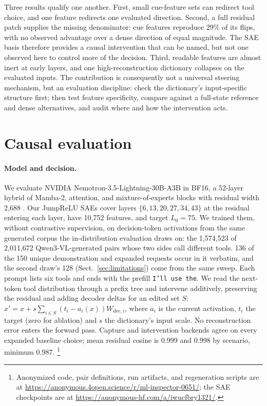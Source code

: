\documentclass{article}
\begin{document}
Three results qualify one another. First, small cue-feature sets can redirect
tool choice, and one feature redirects one evaluated direction. Second, a full
residual patch supplies the missing denominator: cue features reproduce 29\% of
its flips, with no observed advantage over a dense direction of equal
magnitude. The SAE basis therefore provides a causal intervention that can be
named, but not one observed here to control more of the decision. Third, readable features
are almost inert at early layers, and one high-reconstruction dictionary
collapses on the evaluated inputs. The contribution is consequently not a
universal steering mechanism, but an evaluation discipline: check the
dictionary's input-specific structure first; then test feature specificity,
compare against a full-state reference and dense alternatives, and audit
where and how the intervention acts.

\section{Causal evaluation}
\label{sec:method}

\paragraph{Model and decision.}
We evaluate NVIDIA Nemotron-3.5-Lightning-30B-A3B in BF16, a 52-layer hybrid of
Mamba-2, attention, and mixture-of-experts blocks with residual width 2,688
\citep{nvidia2026nemotron35}.
Our JumpReLU SAEs \citep{ref_rajamanoharan2024} cover layers
$\{6,13,20,27,34,43\}$ at the residual entering each layer, have 10,752
features, and target $L_0=75$. We trained them, without contrastive
supervision, on decision-token activations from the same generated corpus the
in-distribution evaluation draws on: the 1,574,523 of 2,011,672
Qwen3-VL-generated pairs whose two sides call different tools. 136 of the 150 unique demonstration and expanded requests occur in
it verbatim, and the second draw's 128 (Sect.~\ref{sec:limitations}) come from
the same sweep.
Each prompt lists six tools and ends with the prefill \texttt{I'll use the}.
We read the next-token tool distribution through a prefix tree and intervene
additively, preserving the residual and adding decoder deltas for an edited set
$S$: $x'=x+s\sum_{i\in S}(t_i-a_i(x))W_{\mathrm{dec},i}$, where $a_i$ is the
current activation, $t_i$ the target (zero for ablation) and $s$ the
dictionary's input scale. No reconstruction error enters the forward pass. Capture and intervention backends
agree on every expanded baseline choice; mean residual cosine is 0.999 and
0.998 by scenario, minimum 0.987.
\footnote{Anonymized code, pair definitions, run artifacts, and regeneration
scripts are at \url{https://anonymous.4open.science/r/ml-inspector-0651/};
the SAE checkpoints are at \url{https://anonymous-hf.com/a/iwucfbry1321/}.}
\end{document}

